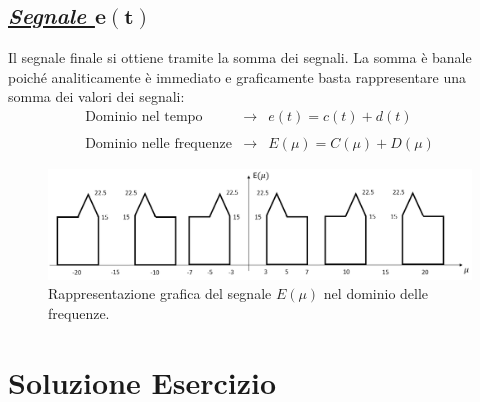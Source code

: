 \documentclass[a4paper]{article}
\begin{document}
	\subsection*{\textcolor{Green4}{\underline{\textbf{\emph{Segnale $\boldsymbol{e\left(t\right)}$}}}}}
	
	Il segnale finale si ottiene tramite la somma dei segnali. La somma è banale poiché analiticamente è immediato e graficamente basta rappresentare una somma dei valori dei segnali:
	\begin{equation*}
		\begin{array}{lll}
			\text{Dominio nel tempo} 		& \longrightarrow & e\left(t\right) = c\left(t\right) + d\left(t\right) \\
			\\
			\text{Dominio nelle frequenze} 	& \longrightarrow & E\left(\mu\right) = C\left(\mu\right) + D\left(\mu\right)
		\end{array}
	\end{equation*}
	\begin{figure}[!htp]
		\centering
		\includegraphics[width=\textwidth]{img/fig_5.png}
		\caption*{Rappresentazione grafica del segnale $E\left(\mu\right)$ nel dominio delle frequenze.}
	\end{figure}\newpage

	\section{Soluzione Esercizio}
	
\end{document}
